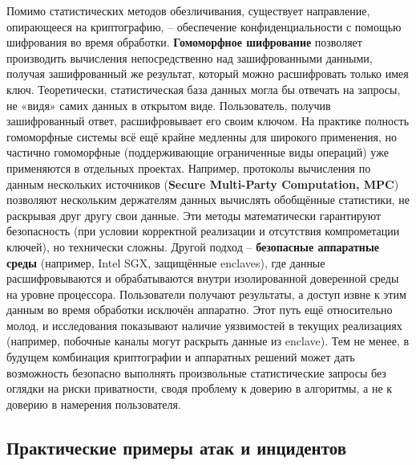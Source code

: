 Помимо статистических методов обезличивания, существует направление, опирающееся на криптографию, – обеспечение конфиденциальности с помощью шифрования во время обработки. \textbf{Гомоморфное шифрование} позволяет производить вычисления непосредственно над зашифрованными данными, получая зашифрованный же результат, который можно расшифровать только имея ключ. Теоретически, статистическая база данных могла бы отвечать на запросы, не «видя» самих данных в открытом виде. Пользователь, получив зашифрованный ответ, расшифровывает его своим ключом. На практике полность гомоморфные системы всё ещё крайне медленны для широкого применения, но частично гомоморфные (поддерживающие ограниченные виды операций) уже применяются в отдельных проектах. Например, протоколы вычисления по данным нескольких источников (\textbf{Secure Multi-Party Computation, MPC}) позволяют нескольким держателям данных вычислять обобщённые статистики, не раскрывая друг другу свои данные. Эти методы математически гарантируют безопасность (при условии корректной реализации и отсутствия компрометации ключей), но технически сложны. Другой подход – \textbf{безопасные аппаратные среды} (например, Intel SGX, защищённые enclaves), где данные расшифровываются и обрабатываются внутри изолированной доверенной среды на уровне процессора. Пользователи получают результаты, а доступ извне к этим данным во время обработки исключён аппаратно. Этот путь ещё относительно молод, и исследования показывают наличие уязвимостей в текущих реализациях (например, побочные каналы могут раскрыть данные из enclave). Тем не менее, в будущем комбинация криптографии и аппаратных решений может дать возможность безопасно выполнять произвольные статистические запросы без оглядки на риски приватности, сводя проблему к доверию в алгоритмы, а не к доверию в намерения пользователя. \subsection{Практические примеры атак и инцидентов}
